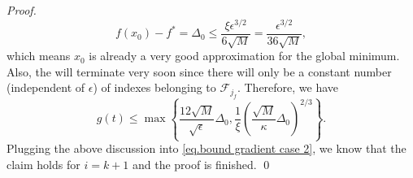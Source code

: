 \begin{proof}
\begin{equation*}
    f(x_0)-f^*=\Delta_0 \leq \frac{\xi\epsilon^{3/2}}{6\sqrt{M}}=\frac{\epsilon^{3/2}}{36\sqrt{M}},
\end{equation*}
which means $x_0$ is already a very good approximation for the global minimum. Also, the  will terminate very soon since there will only be a constant number (independent of $\epsilon$) of indexes belonging to $\mathcal{F}_{j_f}$. Therefore, we have
        \begin{equation*}
            g(t) \leq \max\left\{\frac{12\sqrt{M}}{\sqrt{\epsilon}}\Delta_0,\frac{1}{\xi}\left (\frac{\sqrt{M}}{\kappa}\Delta_0\right)^{2/3}\right\}.
        \end{equation*}
        Plugging the above discussion into \eqref{eq.bound gradient case 2}, we know that the claim holds for $i=k+1$ and the proof is finished.
\smartqed \qed
\end{proof}

